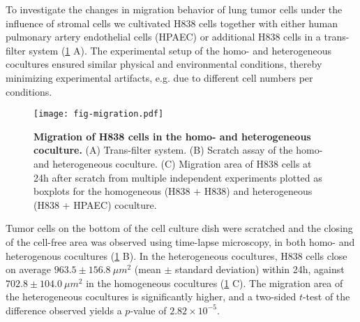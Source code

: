 To investigate the changes in migration behavior of lung tumor cells under the 
influence of stromal cells we cultivated  
H838 cells  together with either human pulmonary artery endothelial cells (HPAEC) or additional H838 cells in a trans-filter system (\ref{fig:migration} A).
The experimental setup of the homo- and heterogeneous cocultures ensured 
similar physical and environmental conditions, thereby minimizing 
experimental artifacts, e.g. due to different cell numbers per conditions. 

\begin{figure}[!ht]
\begin{center}
\texttt{[image: fig-migration.pdf]}
\end{center}
\caption[H838 migration in homo- and heterogeneous coculture]{
{\bf Migration of H838 cells in the homo- and heterogeneous coculture.} 
(A) Trans-filter system. (B) Scratch assay of the homo- and heterogeneous coculture.
(C) Migration area of H838 cells at 24h after scratch from multiple independent 
experiments 
plotted as 
boxplots for the homogeneous (H838 + H838) and heterogeneous (H838 + HPAEC) 
coculture.
}
\label{fig:migration}
\end{figure}

Tumor cells on the bottom of the cell culture dish were scratched and the 
closing of the cell-free area was observed using time-lapse microscopy, in both
homo- and heterogenous cocultures (\ref{fig:migration} B).
In the heterogeneous cocultures, 
H838 cells close on average $963.5\pm156.8\ \mu m^2$ 
(mean $\pm$ standard deviation) within 24h, 
against $702.8\pm104.0\ \mu m^2$ in the homogeneous cocultures 
(\ref{fig:migration} C). 
The migration area of the heterogeneous cocultures is significantly higher, and
a two-sided  $t$-test of the difference observed yields a $p$-value of 
$2.82 \times 10^{-5}$.


